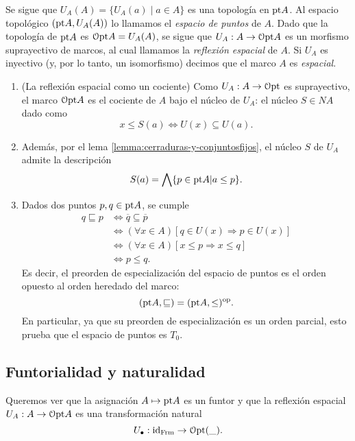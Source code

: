 Se sigue que $U_A(A)=\{U_A(a)\mid a\in A\}$ es una topología en $\mathrm{pt}
A$. Al espacio topológico $(\mathrm{pt} A,U_A(A))$ lo llamamos
el \textit{espacio de puntos} de $A$.
Dado que la topología de $\mathrm{pt} A$ es $\mathcal{O}\mathrm{pt} A=U_A(A)$,
se sigue que $U_A:A\to\mathcal{O}\mathrm{pt} A$ es un
morfismo suprayectivo de marcos, al cual llamamos la \textit{reflexión
espacial} de $A$. Si $U_A$ es inyectivo (y, por lo tanto, un
isomorfismo) decimos que el marco $A$ es \textit{espacial}.

\begin{remark}
  \leavevmode
  \begin{enumerate}
    \item (La reflexión espacial como un cociente)
      Como $U_A:A\to\mathcal{O}\mathrm{pt}$ es suprayectivo, el marco $\mathcal{O}\mathrm{pt} A$ 
      es el cociente de $A$ bajo el núcleo de $U_A$: el núcleo
      $S\in NA$ dado como
      \[
        x\leq S(a) \iff U(x)\subseteq U(a)
      .\]
    \item
      Además, por el lema \ref{lemma:cerraduras-y-conjuntosfijos}, el
      núcleo $S$ de $U_A$ admite la descripción
      \[
        S(a)=\bigwedge \{p\in \mathrm{pt} A|a\leq p\}
      .\]
    \item
      Dados dos puntos $p,q\in \mathrm{pt} A$, se cumple
      \begin{align*}
        q\sqsubseteq p&\iff \overline{q}\subseteq \overline{p}\\
        &\iff (\forall x\in A)[q\in U(x)\Rightarrow p\in U(x)]\\
        &\iff (\forall x\in A)[x\leq p\Rightarrow x\leq q]\\
        &\iff p\leq q.
      \end{align*}
      Es decir, el preorden de especialización del espacio de puntos es
      el orden opuesto al orden heredado del marco:
      \[
        (\mathrm{pt} A,\sqsubseteq) = (\mathrm{pt} A,\leq)^{\mathrm{op}}.
      \]
      En particular, ya que su preorden de especialización es un orden
      parcial, esto prueba que el espacio de puntos es $T_0$.
  \end{enumerate}
\end{remark}

\subsection{Funtorialidad y naturalidad}
Queremos ver que la asignación $A\mapsto \mathrm{pt} A$ es un funtor y que
la reflexión espacial $U_A:A\to\mathcal{O}\mathrm{pt} A$
es una transformación natural
\[U_\bullet:\mathrm{id}_{\mathrm{Frm}}\to\mathcal{O}\mathrm{pt}(\_).\]

